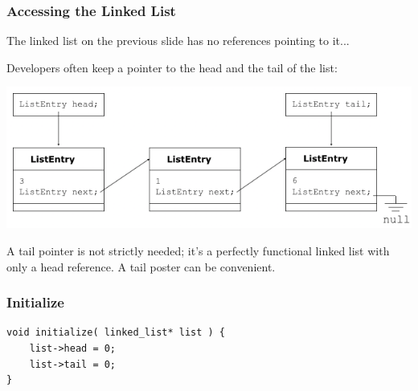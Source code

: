 \begin{frame}
\frametitle{Accessing the Linked List}
The linked list on the previous slide has no references pointing to it...

Developers often keep a pointer to the head and the tail of the list:

\begin{center}
    \includegraphics[width=\textwidth]{images/listheadtail.png}
\end{center}

A tail pointer is not strictly needed; it's a perfectly functional linked list with only a head reference. A tail poster can be convenient.

\end{frame}



\begin{frame}[fragile]
\frametitle{Initialize}

\begin{verbatim}
void initialize( linked_list* list ) {
    list->head = 0;
    list->tail = 0;
}
\end{verbatim}

\end{frame}

